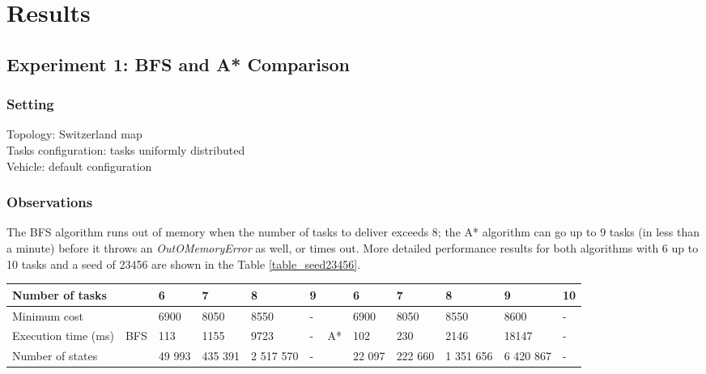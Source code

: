 \documentclass[10pt]{article}
\begin{document}
\section{Results}

\subsection{Experiment 1: BFS and A* Comparison}

\subsubsection{Setting}
Topology: Switzerland map\\
Tasks configuration: tasks uniformly distributed\\
Vehicle: default configuration

\subsubsection{Observations}
The BFS algorithm runs out of memory when the number of tasks to deliver exceeds 8; the A* algorithm can go up to 9 tasks (in less than a minute) before it throws an \textit{OutOMemoryError} as well, or times out.
More detailed performance results for both algorithms with 6 up to 10 tasks and a seed of 23456 are shown in the Table \ref{table_seed23456}.\\

\begin{adjustwidth}{0cm}{}
\begin{tabular}{|l|lllll|llllll|}
\hline
Number of tasks & & 6 & 7 & 8 & 9 & & 6 & 7 & 8 & 9 & 10\\
\hline
Minimum cost & & 6900 & 8050 & 8550 & - & & 6900 & 8050 & 8550 & 8600 & -\\
Execution time (ms) & BFS & 113 & 1155 & 9723 & - & A* & 102 & 230 & 2146 & 18147 & -\\
Number of states & & 49 993 & 435 391 & 2 517 570 & - & & 22 097 & 222 660 & 1 351 656 & 6 420 867 & -\\
\hline
\end{tabular}
\label{table_seed23456}
\end{adjustwidth}
\vspace{4mm}
\end{document}
